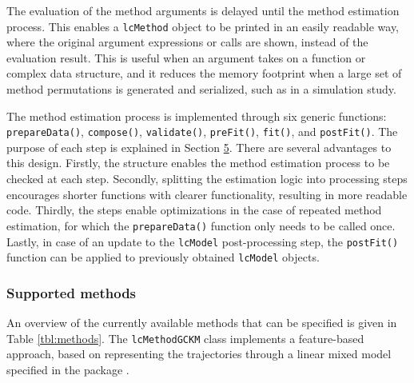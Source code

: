 The evaluation of the method arguments is delayed until the method estimation process. This enables a \texttt{lcMethod} object to be printed in an easily readable way, where the original argument expressions or calls are shown, instead of the evaluation result. This is useful when an argument takes on a function or complex data structure, and it reduces the memory footprint when a large set of method permutations is generated and serialized, such as in a simulation study.

The method estimation process is implemented through six generic functions: \texttt{prepareData()}, \texttt{compose()}, \texttt{validate()}, \texttt{preFit()}, \texttt{fit()}, and \texttt{postFit()}. The purpose of each step is explained in Section \hyperref[sec:extension]{5}. There are several advantages to this design. Firstly, the structure enables the method estimation process to be checked at each step. Secondly, splitting the estimation logic into processing steps encourages shorter functions with clearer functionality, resulting in more readable code. Thirdly, the steps enable optimizations in the case of repeated method estimation, for which the \texttt{prepareData()} function only needs to be called once. Lastly, in case of an update to the \texttt{lcModel} post-processing step, the \texttt{postFit()} function can be applied to previously obtained \texttt{lcModel} objects.

\subsubsection{Supported methods}\label{supported-methods}

An overview of the currently available methods that can be specified is given in Table \ref{tbl:methods}. The \texttt{lcMethodGCKM} class implements a feature-based approach, based on representing the trajectories through a linear mixed model specified in the  package \citep{Bates2015Fitting}.

\renewcommand{\arraystretch}{1.5}

